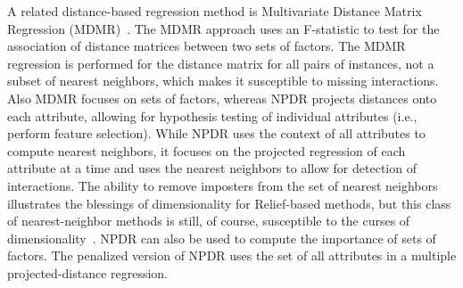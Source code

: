 \documentclass[10pt]{article}
\begin{document}

A related distance-based regression method is Multivariate Distance Matrix Regression (MDMR)~\cite{schork12}. The MDMR approach uses an F-statistic to test for the association of distance matrices between two sets of factors. The MDMR regression is performed for the distance matrix for all pairs of instances, not a subset of nearest neighbors, which makes it susceptible to missing interactions. Also MDMR focuses on sets of factors, whereas NPDR projects distances onto each attribute, allowing for hypothesis testing of individual attributes (i.e., perform feature selection). While NPDR uses the context of all attributes to compute nearest neighbors, it focuses on the projected regression of each attribute at a time and uses the nearest neighbors to allow for detection of interactions. The ability to remove imposters from the set of nearest neighbors illustrates the blessings of dimensionality for Relief-based methods, but this class of nearest-neighbor methods is still, of course, susceptible to the curses of dimensionality~\cite{CoD}. NPDR can also be used to compute the importance of sets of factors. The penalized version of NPDR uses the set of all attributes in a multiple projected-distance regression.
\end{document}
